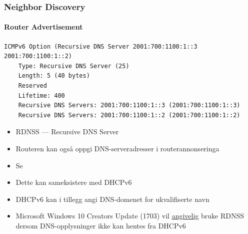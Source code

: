\begin{frame}[fragile]%
  \frametitle{Neighbor Discovery}
  \framesubtitle{Router Advertisement}
  \begin{multicols}{2}
\begin{Verbatim}[fontsize=\tiny]
ICMPv6 Option (Recursive DNS Server 2001:700:1100:1::3 2001:700:1100:1::2)
    Type: Recursive DNS Server (25)
    Length: 5 (40 bytes)
    Reserved
    Lifetime: 400
    Recursive DNS Servers: 2001:700:1100:1::3 (2001:700:1100:1::3)
    Recursive DNS Servers: 2001:700:1100:1::2 (2001:700:1100:1::2)
\end{Verbatim}
  \columnbreak
  \begin{itemize}%
  \item RDNSS --- Recursive DNS Server
  \item Routeren kan også oppgi DNS-serveradresser i routerannonseringa
  \item Se 
  \item Dette kan sameksistere med DHCPv6
  \item DHCPv6 kan i tillegg angi DNS-domenet for ukvalifiserte navn
  \item Microsoft Windows 10 Creators Update (1703) vil
    \href{https://insinuator.net/2017/05/one-step-closer-rdnss-rfc-8106-support-in-windows-10-creators-update/}{angivelig}
    bruke RDNSS dersom DNS-opplysninger ikke kan hentes fra DHCPv6
  \end{itemize}
  \end{multicols}
\end{frame}

